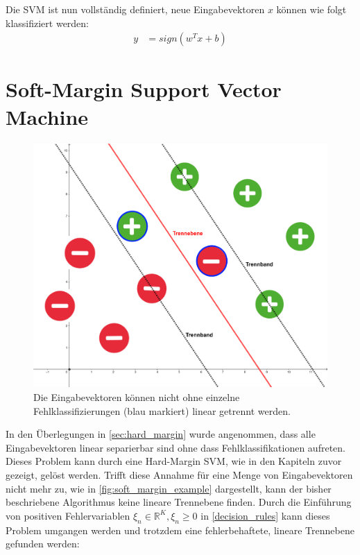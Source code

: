 \documentclass[a4paper,11pt,twoside]{scrreprt}
\begin{document}
Die \ac{SVM} ist nun vollständig definiert, neue Eingabevektoren $x$ können wie folgt klassifiziert werden:
\begin{equation} \label{svm_classify}
	\begin{aligned}
		y &= sign(w^{T} x + b)
	\end{aligned}
\end{equation}

\chapter{Soft-Margin Support Vector Machine} \label{sec:soft_margin}
\begin{figure}[H]
	\centering
	\includegraphics[width = 12cm]{assets/soft_margin_example.png}
	\caption{Die Eingabevektoren können nicht ohne einzelne Fehlklassifizierungen (blau markiert) linear getrennt werden.}
	\label{fig:soft_margin_example}
\end{figure}

In den Überlegungen in \autoref{sec:hard_margin} wurde angenommen, dass alle Eingabevektoren linear separierbar sind ohne dass Fehlklassifikationen aufreten. Dieses Problem kann durch eine Hard-Margin \ac{SVM}, wie in den Kapiteln zuvor gezeigt, gelöst werden. Trifft diese Annahme für eine Menge von Eingabevektoren nicht mehr zu, wie in \autoref{fig:soft_margin_example} dargestellt, kann der bisher beschriebene Algorithmus keine lineare Trennebene finden. Durch die Einführung von positiven Fehlervariablen $\xi_{n} \in \mathbb{R}^{K}, \xi_{n} \geq 0$ in \autoref{decision_rules} kann dieses Problem umgangen werden und trotzdem eine fehlerbehaftete, lineare Trennebene gefunden werden:
\end{document}

